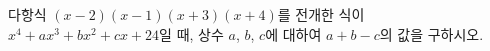다항식 $(x-2)(x-1)(x+3)(x+4)$를 전개한 식이 $x^4+ax^3+bx^2+cx+24$일 때, 상수 $a$, $b$, $c$에 대하여 $a+b-c$의 값을 구하시오.
